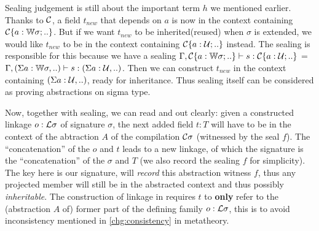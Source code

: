 Sealing judgement is still about the important term $h$ we mentioned
earlier. Thanks to ${\mathcal{C}}$, a field $t_{new}$ that depends on $a$ is now
in the context containing ${\mathcal{C}}\{a : {\mathbb{W}} \sigma; ..\}$.
But if we want $t_{new}$ to be inherited(reused) when $\sigma$ is
extended, we would like $t_{new}$ to be in the context containing
${\mathcal{C}}\{a : {\mathcal{U}}; ..\}$ instead. The sealing is responsible for this
because we have a sealing ${ {\Gamma, {\mathcal{C}}\{a : {\mathbb{W}} \sigma;
..\}} \vdash {s} : {{\mathcal{C}}\{a : {\mathcal{U}}; ..\}} }$ = ${ {\Gamma, (\Sigma a : {\mathbb{W}}
\sigma,..)} \vdash {s} : {(\Sigma a : {\mathcal{U}},..)} }$. Then we can construct
$t_{new}$ in the context containing $(\Sigma a : {\mathcal{U}},..)$, ready for
inheritance. Thus sealing itself can be considered as proving 
abstractions on sigma type. 





Now, together with sealing, we can read  and  out clearly: given a constructed linkage $o : {\mathcal{L}}\sigma$ of signature $\sigma$, the next added field $t : T$ will have to be in the context of the abtraction $A$ of the compilation ${\mathcal{C}}\sigma$ (witnessed by the seal $f$). The ``concatenation'' of the $o$ and $t$ leads to a new linkage, of which the signature is the ``concatenation'' of the $\sigma$ and $T$ (we also record the sealing $f$ for simplicity). The key here is our signature, will \textit{record} this abstraction witness $f$, thus any projected member will still be in the abstracted context and thus possibly \textit{inheritable}.  The construction of linkage in  requires $t$ to \textbf{only} refer to the (abstraction $A$ of) former part of the defining family $o : {\mathcal{L}}\sigma$, this is to avoid inconsistency mentioned in \ref{chg:consistency} in metatheory.

